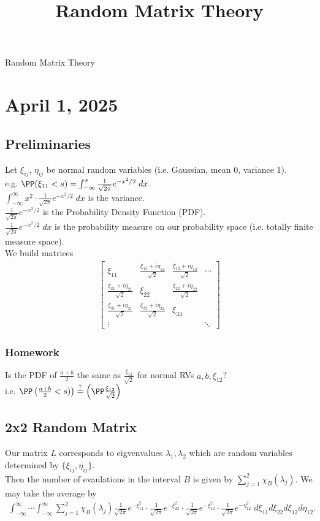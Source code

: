 \documentclass[11pt]{article}
\date{}
\title{Random Matrix Theory}
\begin{document}
{\centering
{\LARGE Random Matrix Theory \par }}
\section*{April 1, 2025}
\label{sec:org0bcd32d}
\subsection*{Preliminaries}
\label{sec:orgafec138}
Let \(\xi_{ij}\), \(\eta_{ij}\) be normal random variables (i.e. Gaussian, mean 0, variance 1).\\
e.g. \(\PP(\xi_{11}<s)=\int_{-\infty}^{s}\frac{1}{\sqrt{2\pi}}e^{-x^{2}/2}\;dx\).\\
\(\int_{-\infty}^{\infty}x^{2}\cdot\frac{1}{\sqrt{2\pi}}e^{-x^{2}/2}\;dx\) is the variance.\\
\(\frac{1}{\sqrt{2\pi}}e^{-x^{2}/2}\) is the Probability Density Function (PDF).\\
\(\frac{1}{\sqrt{2\pi}}e^{-x^{2}/2}\;dx\) is the probability measure on our probability space (i.e. totally finite measure space).\\
We build matrices\\
\begin{align*}
  \begin{bmatrix}
    \xi_{11} & \frac{\xi_{12}+i\eta_{12}}{\sqrt{2}} & \frac{\xi_{13}+i\eta_{13}}{\sqrt{2}} & \cdots \\
    \frac{\xi_{21}+i\eta_{21}}{\sqrt{2}} & \xi_{22} & \frac{\xi_{22}+i\eta_{22}}{\sqrt{2}} \\
    \frac{\xi_{31}+i\eta_{31}}{\sqrt{2}} & \frac{\xi_{32}+i\eta_{32}}{\sqrt{2}} &  \xi_{33} \\
    \vdots & & & \ddots
  \end{bmatrix}
\end{align*}
\subsubsection*{Homework}
\label{sec:org9e734df}
Is the PDF of \(\frac{a+b}{2}\) the same as \(\frac{\xi_{12}}{\sqrt{2}}\) for normal RVs \(a,b,\xi_{12}\)?\\
i.e. \(\PP\left( \frac{a+b}{2}<s) \right)\overset{?}{=}\left( \PP\frac{\xi_{12}}{\sqrt{2}} \right)\)\\
\subsection*{2x2 Random Matrix}
\label{sec:orgc31868d}
Our matrix \(L\) corresponds to eigvenvalues \(\lambda_{1},\lambda_{2}\) which are random variables determined by \(\{\xi_{ij},\eta_{ij}\}\).\\
Then the number of evaulations in the interval \(B\) is given by \(\sum_{j=1}^{2}\chi_{B}(\lambda_{j})\). We may take the average by\\
\begin{align*}
  \int_{-\infty}^{\infty}\cdots\int_{-\infty}^{\infty}\sum_{j=1}^{2}\chi_{B}(\lambda_{j})\frac{1}{\sqrt{2\pi}}e^{-\xi^{2}_{11}}\cdot\frac{1}{\sqrt{2\pi}}e^{-\xi^{2}_{22}}\cdot\frac{1}{\sqrt{2\pi}}e^{-\xi^{2}_{12}}\cdot\frac{1}{\sqrt{2\pi}}e^{-\eta^{2}_{12}}\;d\xi_{11}d\xi_{22}d\xi_{12}d\eta_{12}.
\end{align*}
\end{document}
